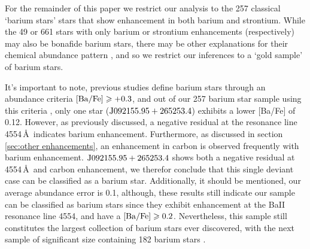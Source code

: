 \documentclass[a4paper,fleqn,usenatbib]{mnras}
\begin{document}
For the remainder of this paper we restrict our analysis to the 257 classical `barium stars' stars that show enhancement in both barium and strontium. While the 49 or 661 stars with only barium or strontium enhancements (respectively) may also be bonafide barium stars, there may be other explanations for their chemical abundance pattern \citep[e.g.,][]{maiorca2011}, and so we restrict our inferences to a `gold sample' of barium stars. 

It's important to note, previous studies \citet{malaney1988} define barium stars through an abundance criteria $\rm[Ba/Fe]\geq +0.3$, and out of our 257 barium star sample using this criteria , only one star ($\rm J092155.95+265253.4$) exhibits a lower [Ba/Fe] of 0.12. However, as previously discussed, a negative residual at the  resonance line 4554\,\AA\, indicates barium enhancement. Furthermore, as discussed in section \ref{sec:other enhancements}, an enhancement in carbon is observed frequently with barium enhancement. $\rm J092155.95+265253.4$ shows both a negative residual at 4554\,\AA\, and carbon enhancement, we therefor conclude that this single deviant case can be classified as a barium star. Additionally, it should be mentioned, our average abundance error is 0.1, although, these results still indicate our sample can be classified as barium stars since they exhibit enhancement at the BaII resonance line 4554, and have a $\rm[Ba/Fe] \geq 0.2$. Nevertheless, this sample still constitutes the largest collection of barium stars ever discovered, with the next sample of significant size containing 182 barium stars \citep[e.g.,][]{decastro2016}.
\end{document}
